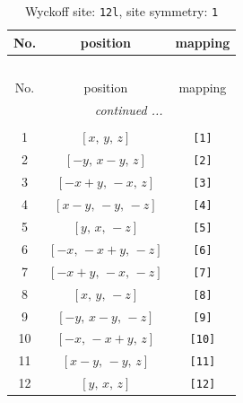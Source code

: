 \documentclass[fleqn,8pt]{jsarticle}
\begin{document}
\begin{longtable}{ccc}
\caption{Wyckoff site: {\tt 12l}, site symmetry: {\tt 1}}
 \\
 \hline \hline
No. & position & mapping \\ \hline \endfirsthead

\multicolumn{2}{l}{\tablename\ \thetable{}} \\
 \hline \hline
No. & position & mapping \\ \hline \endhead

 \hline \hline
\multicolumn{2}{r}{\footnotesize\it continued ...} \\ \endfoot

 \hline \hline
\multicolumn{2}{r}{} \\ \endlastfoot

1 & $\left[ x,\, y,\, z \right]$ & {\tt [1]} \\ \hline
2 & $\left[ - y,\, x - y,\, z \right]$ & {\tt [2]} \\ \hline
3 & $\left[ - x + y,\, - x,\, z \right]$ & {\tt [3]} \\ \hline
4 & $\left[ x - y,\, - y,\, - z \right]$ & {\tt [4]} \\ \hline
5 & $\left[ y,\, x,\, - z \right]$ & {\tt [5]} \\ \hline
6 & $\left[ - x,\, - x + y,\, - z \right]$ & {\tt [6]} \\ \hline
7 & $\left[ - x + y,\, - x,\, - z \right]$ & {\tt [7]} \\ \hline
8 & $\left[ x,\, y,\, - z \right]$ & {\tt [8]} \\ \hline
9 & $\left[ - y,\, x - y,\, - z \right]$ & {\tt [9]} \\ \hline
10 & $\left[ - x,\, - x + y,\, z \right]$ & {\tt [10]} \\ \hline
11 & $\left[ x - y,\, - y,\, z \right]$ & {\tt [11]} \\ \hline
12 & $\left[ y,\, x,\, z \right]$ & {\tt [12]} \\
\end{longtable}
\end{document}
